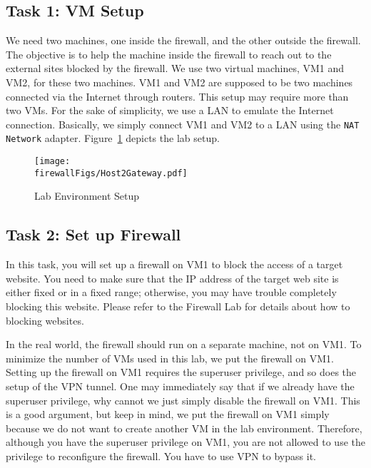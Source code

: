 \subsection{Task 1: VM Setup}

 
We need two machines, one inside the firewall, and the other
outside the firewall. The objective is to help the machine
inside the firewall to reach out to the external sites blocked by the firewall. 
We use two virtual machines, VM1 and VM2, for these two machines. 
VM1 and VM2 are supposed to be two machines connected via the Internet through
routers. This setup may require more than two VMs. 
For the sake of simplicity, we use a LAN to emulate the Internet connection.
Basically, we simply connect VM1 and VM2 to a LAN using the \texttt{NAT Network} 
adapter. Figure~\ref{vpn_firewall:fig:labsetup} depicts the lab setup.

\begin{figure}[htb]
  \begin{center}
    \texttt{[image: \\firewallFigs/Host2Gateway.pdf]}
  \end{center}
  \caption{Lab Environment Setup}
  \label{vpn_firewall:fig:labsetup}
\end{figure}



\subsection{Task 2: Set up Firewall}

In this task, you will set up a firewall on VM1 to block the access of a target website. You
need to make sure that the IP address of the target web site is either fixed or in a fixed
range; otherwise, you may have trouble completely blocking this website. Please refer to the
Firewall Lab for details about how to blocking websites.

In the real world, the firewall should run on a separate machine, not on VM1. To minimize the number of VMs
used in this lab, we put the firewall on VM1. Setting up the firewall on VM1 requires the superuser
privilege, and so does the setup of the VPN tunnel. One may immediately say that if we already
have the superuser privilege, why cannot we just simply disable the firewall on VM1. This is a good argument,
but keep in mind, we put the firewall on VM1 simply because we do not want to create another VM
in the lab environment. Therefore, although you have the superuser privilege on VM1, you are
not allowed to use the privilege to reconfigure the firewall. You have to use VPN to bypass
it.

